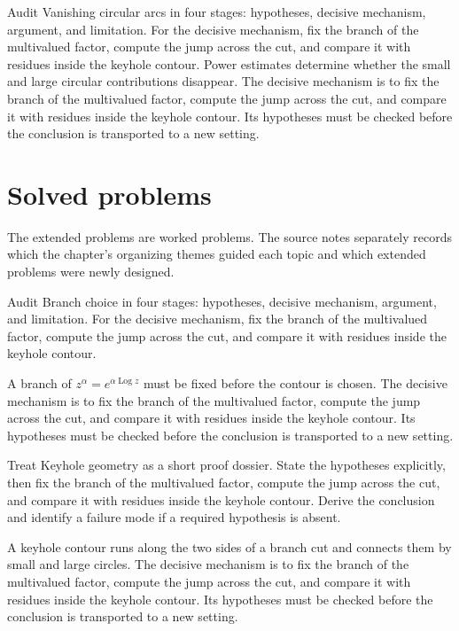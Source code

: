 \begin{example}\label{ex:iv21-worked-04}
Audit Vanishing circular arcs in four stages: hypotheses, decisive mechanism, argument, and limitation. For the decisive mechanism, fix the branch of the multivalued factor, compute the jump across the cut, and compare it with residues inside the keyhole contour. Power estimates determine whether the small and large circular contributions disappear. The decisive mechanism is to fix the branch of the multivalued factor, compute the jump across the cut, and compare it with residues inside the keyhole contour. Its hypotheses must be checked before the conclusion is transported to a new setting.
\end{example}

\section{Solved problems}
The extended problems are worked problems. The source notes separately records which the chapter's organizing themes guided each topic and which extended problems were newly designed.

\begin{problem}\label{prob:iv21-problem-01}
Audit Branch choice in four stages: hypotheses, decisive mechanism, argument, and limitation. For the decisive mechanism, fix the branch of the multivalued factor, compute the jump across the cut, and compare it with residues inside the keyhole contour.
\end{problem}
\begin{solution}
A branch of $z^\alpha=e^{\alpha\operatorname{Log} z}$ must be fixed before the contour is chosen. The decisive mechanism is to fix the branch of the multivalued factor, compute the jump across the cut, and compare it with residues inside the keyhole contour. Its hypotheses must be checked before the conclusion is transported to a new setting.
\end{solution}

\begin{problem}\label{prob:iv21-problem-02}
Treat Keyhole geometry as a short proof dossier. State the hypotheses explicitly, then fix the branch of the multivalued factor, compute the jump across the cut, and compare it with residues inside the keyhole contour. Derive the conclusion and identify a failure mode if a required hypothesis is absent.
\end{problem}
\begin{solution}
A keyhole contour runs along the two sides of a branch cut and connects them by small and large circles. The decisive mechanism is to fix the branch of the multivalued factor, compute the jump across the cut, and compare it with residues inside the keyhole contour. Its hypotheses must be checked before the conclusion is transported to a new setting.
\end{solution}

